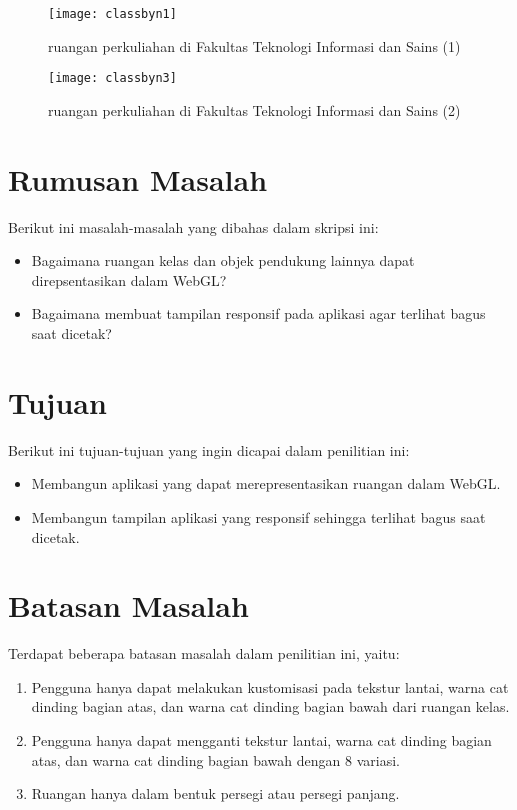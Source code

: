 \begin{figure}
	\centering
	\texttt{[image: classbyn1]}
	\caption{ruangan perkuliahan di Fakultas Teknologi Informasi dan Sains (1)}
	\vspace{8mm}
	\texttt{[image: classbyn3]}
	\caption{ruangan perkuliahan di Fakultas Teknologi Informasi dan Sains (2)}
\end{figure}

\section{Rumusan Masalah}
\label{sec:rumusan}
Berikut ini masalah-masalah yang dibahas dalam skripsi ini:
\begin{itemize}
    \item Bagaimana ruangan kelas dan objek pendukung lainnya dapat direpsentasikan dalam WebGL?
    \item Bagaimana membuat tampilan responsif pada aplikasi agar terlihat bagus saat dicetak?
\end{itemize}

\section{Tujuan}
\label{sec:tujuan}
Berikut ini tujuan-tujuan yang ingin dicapai dalam penilitian ini:
\begin{itemize}
    \item Membangun aplikasi yang dapat merepresentasikan ruangan dalam WebGL.
    \item Membangun tampilan aplikasi yang responsif sehingga terlihat bagus saat dicetak.
\end{itemize}

\section{Batasan Masalah}
\label{sec:batasan}
Terdapat beberapa batasan masalah dalam penilitian ini, yaitu:
\begin{enumerate}
    \item Pengguna hanya dapat melakukan kustomisasi pada tekstur lantai, warna cat dinding bagian atas, dan warna cat dinding bagian bawah dari ruangan kelas.
    \item Pengguna hanya dapat mengganti tekstur lantai, warna cat dinding bagian atas, dan warna cat dinding bagian bawah dengan 8 variasi.
    \item Ruangan hanya dalam bentuk persegi atau persegi panjang.
\end{enumerate}

